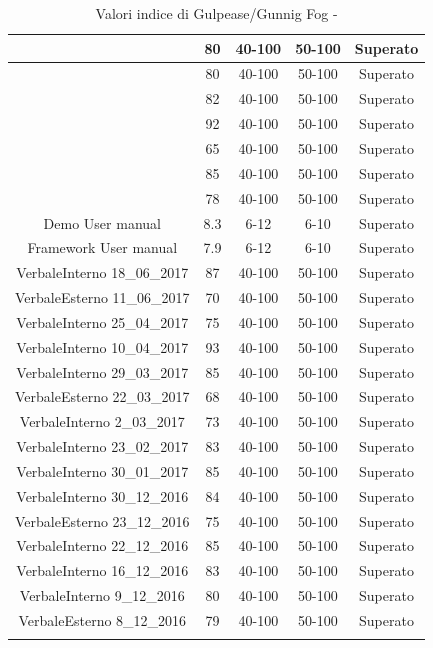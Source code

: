 \begin{longtable}{|c|c|c|c|c|}
	\hline \NormeDiProgetto{} & 80 & 40-100 & 50-100 & Superato\\
	\hline \PianoDiProgetto{} & 80 & 40-100 & 50-100 & Superato \\
	\hline \PianoDiQualifica{} & 82 & 40-100 & 50-100 & Superato \\
	\hline \AnalisiDeiRequisiti{} & 92 & 40-100 & 50-100 & Superato \\
	\hline \Glossario{} & 65 & 40-100 & 50-100 & Superato \\
	\hline \SpecificaTecnica{} & 85 & 40-100 & 50-100 & Superato\\
	\hline \DefinizioneDiProdotto{} & 78 & 40-100 & 50-100 & Superato\\
	\hline Demo User manual & 8.3 & 6-12 & 6-10 & Superato\\
	\hline Framework User manual & 7.9 & 6-12 & 6-10 & Superato\\
	\hline VerbaleInterno 18\_06\_2017 & 87 & 40-100 & 50-100 & Superato \\
	\hline VerbaleEsterno 11\_06\_2017 & 70 & 40-100 & 50-100 & Superato \\
	\hline VerbaleInterno 25\_04\_2017 & 75 & 40-100 & 50-100 & Superato \\
	\hline VerbaleInterno 10\_04\_2017 & 93 & 40-100 & 50-100 & Superato \\
	\hline VerbaleInterno 29\_03\_2017 & 85 & 40-100 & 50-100 & Superato \\
	\hline VerbaleEsterno 22\_03\_2017 & 68 & 40-100 & 50-100 & Superato \\
	\hline VerbaleInterno 2\_03\_2017 & 73 & 40-100 & 50-100 & Superato \\
	\hline VerbaleInterno 23\_02\_2017 & 83 & 40-100 & 50-100 & Superato \\
	\hline VerbaleInterno 30\_01\_2017 & 85 & 40-100 & 50-100 & Superato \\
	\hline VerbaleInterno 30\_12\_2016 & 84 & 40-100 & 50-100 & Superato \\
	\hline VerbaleEsterno 23\_12\_2016 & 75 & 40-100 & 50-100 & Superato \\
	\hline VerbaleInterno 22\_12\_2016 & 85 & 40-100 & 50-100 & Superato \\
	\hline VerbaleInterno 16\_12\_2016 & 83 & 40-100 & 50-100 & Superato \\
	\hline VerbaleInterno 9\_12\_2016 & 80 & 40-100 & 50-100 & Superato \\
	\hline VerbaleEsterno 8\_12\_2016 & 79 & 40-100 & 50-100 & Superato \\
	\hline
	\caption{Valori indice di Gulpease/Gunnig Fog - \RA{}}
\end{longtable}


